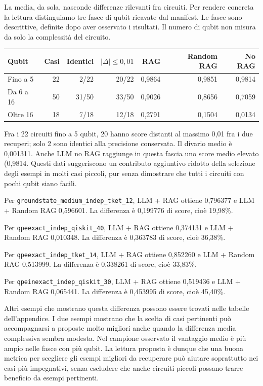 La media, da sola, nasconde differenze rilevanti fra circuiti. Per rendere concreta la lettura distinguiamo tre fasce di qubit ricavate dal manifest. Le fasce sono descrittive, definite dopo aver osservato i risultati. Il numero di qubit non misura da solo la complessità del circuito.
\begin{samepage}
\begingroup\small
\setlength{\tabcolsep}{5pt}
\begin{center}
\begin{tabular}{lrrrrrr}
\toprule
Qubit & Casi & Identici & $|\Delta|\leq0{,}01$ & RAG & Random RAG & No RAG \\
\midrule
Fino a 5 & 22 & 2/22 & 20/22 & 0,9864 & 0,9851 & 0,9814 \\
Da 6 a 16 & 50 & 31/50 & 33/50 & 0,9026 & 0,8656 & 0,7059 \\
Oltre 16 & 18 & 7/18 & 12/18 & 0,2791 & 0,1504 & 0,0134 \\
\bottomrule
\end{tabular}
\end{center}
\endgroup
\end{samepage}
Fra i 22 circuiti fino a 5 qubit, 20 hanno score distanti al massimo 0,01 fra i due recuperi; solo 2 sono identici alla precisione conservata. Il divario medio è 0,001311. Anche LLM no RAG raggiunge in questa fascia uno score medio elevato (0,9814. Questi dati suggeriscono un contributo aggiuntivo ridotto della selezione degli esempi in molti casi piccoli, pur senza dimostrare che tutti i circuiti con pochi qubit siano facili.

Per \nolinkurl{groundstate_medium_indep_tket_12}, LLM + RAG ottiene 0,796377 e LLM + Random RAG 0,596601. La differenza è 0,199776 di score, cioè 19,98\%.

Per \nolinkurl{qpeexact_indep_qiskit_40}, LLM + RAG ottiene 0,374131 e LLM + Random RAG 0,010348. La differenza è 0,363783 di score, cioè 36,38\%.

Per \nolinkurl{qpeexact_indep_tket_14}, LLM + RAG ottiene 0,852260 e LLM + Random RAG 0,513999. La differenza è 0,338261 di score, cioè 33,83\%.

Per \nolinkurl{qpeinexact_indep_qiskit_30}, LLM + RAG ottiene 0,519436 e LLM + Random RAG 0,065441. La differenza è 0,453995 di score, cioè 45,40\%.

Altri esempi che mostrano questa differenza possono essere trovati nelle tabelle dell’appendice. 
I due esempi mostrano che la scelta di casi pertinenti può accompagnarsi a proposte molto migliori anche quando la differenza media complessiva sembra modesta. Nel campione osservato il vantaggio medio è più ampio nelle fasce con più qubit. La lettura proposta è dunque che una buona metrica per scegliere gli esempi migliori da recuperare può aiutare soprattutto nei casi più impegnativi, senza escludere che anche circuiti piccoli possano trarre beneficio da esempi pertinenti.

